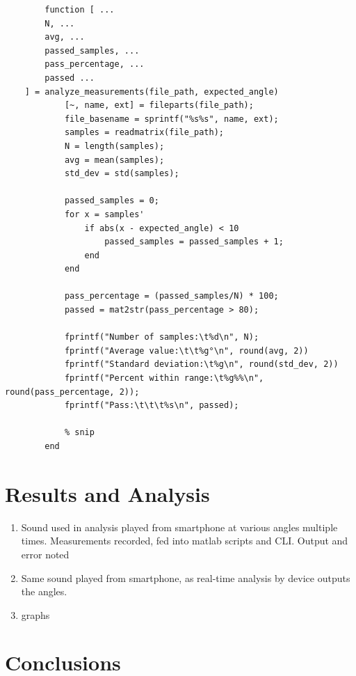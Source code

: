 \documentclass[a4paper]{article}
\begin{document}
\begin{listing}[H]
    \begin{verbatim}
        function [ ...
        N, ...
        avg, ...
        passed_samples, ...
        pass_percentage, ...
        passed ...
    ] = analyze_measurements(file_path, expected_angle) 
            [~, name, ext] = fileparts(file_path);
            file_basename = sprintf("%s%s", name, ext);
            samples = readmatrix(file_path);
            N = length(samples);
            avg = mean(samples);
            std_dev = std(samples);

            passed_samples = 0;
            for x = samples'
                if abs(x - expected_angle) < 10
                    passed_samples = passed_samples + 1;
                end 
            end

            pass_percentage = (passed_samples/N) * 100;
            passed = mat2str(pass_percentage > 80);

            fprintf("Number of samples:\t%d\n", N);
            fprintf("Average value:\t\t%g°\n", round(avg, 2))
            fprintf("Standard deviation:\t%g\n", round(std_dev, 2))
            fprintf("Percent within range:\t%g%%\n", round(pass_percentage, 2));
            fprintf("Pass:\t\t\t%s\n", passed);
            
            % snip
        end
    \end{verbatim}
        \caption{\texttt{analyze\textunderscore measurements.m} Matlab script}
        \label{list:analyze_measurements}
    \end{listing}
    
\section{Results and Analysis}
\begin{enumerate}

    \item Sound used in analysis played from smartphone at various angles multiple times. Measurements recorded, fed into matlab scripts and CLI. Output and error noted
    \item Same sound played from smartphone, as real-time analysis by device outputs the angles.
    \item graphs
\end{enumerate}




\section{Conclusions}




\end{document}
